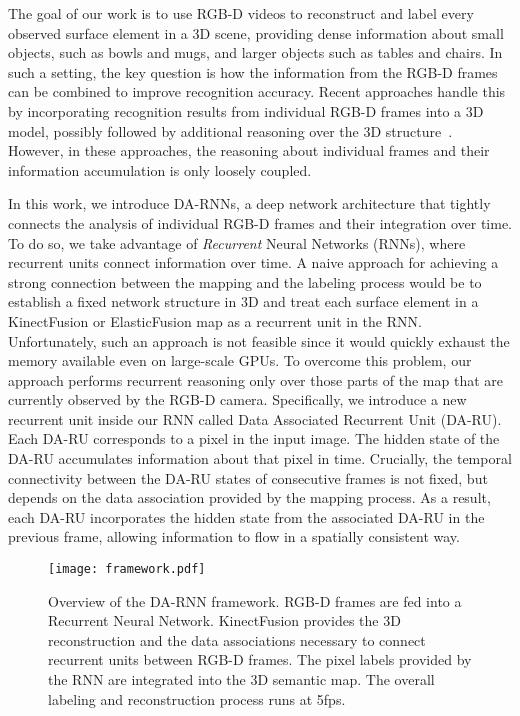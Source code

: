 \documentclass[conference]{IEEEtran}
\begin{document}
The goal of our work is to use RGB-D videos to reconstruct and label every observed surface element in a 3D scene, providing dense information about small objects, such as bowls and mugs, and larger objects such as tables and chairs. In such a setting, the key question is how the information from the RGB-D frames can be combined to improve recognition accuracy. Recent approaches handle this by incorporating recognition results from individual RGB-D frames into a 3D model, possibly followed by additional reasoning over the 3D structure~\cite{Lai13Obj,lai2014unsupervised,mccormac2016semanticfusion}. However, in these approaches, the reasoning about individual frames and their information accumulation is only loosely coupled.

In this work, we introduce DA-RNNs, a deep network architecture that tightly connects the analysis of individual RGB-D frames and their integration over time.  To do so, we take advantage of \emph{Recurrent} Neural Networks (RNNs), where recurrent units connect information over time.  A naive approach for achieving a strong connection between the mapping and the labeling process would be to establish a fixed network structure in 3D and treat each surface element in a KinectFusion or ElasticFusion map as a recurrent unit in the RNN. Unfortunately, such an approach is not feasible since it would quickly exhaust the memory available even on large-scale GPUs. To overcome this problem, our approach performs recurrent reasoning only over those parts of the map that are currently observed by the RGB-D camera.  Specifically, we introduce a new recurrent unit inside our RNN called Data Associated Recurrent Unit (DA-RU). Each DA-RU corresponds to a pixel in the input image. The hidden state of the DA-RU accumulates information about that pixel in time.  Crucially, the temporal connectivity between the DA-RU states of consecutive frames is not fixed, but depends on the data association provided by the mapping process.  As a result, each DA-RU incorporates the hidden state from the associated DA-RU in the previous frame, allowing information to flow in a spatially consistent way.


\begin{figure}
	\centering
	\texttt{[image: framework.pdf]}
	\caption{Overview of the DA-RNN framework.  RGB-D frames are fed into a Recurrent Neural Network.  KinectFusion provides the 3D reconstruction and  the data associations necessary to connect recurrent units between RGB-D frames.  The pixel labels provided by the RNN are integrated into the 3D semantic map. The overall labeling and reconstruction process runs at 5fps.}
	\label{fig:framework}
	\vspace{-4mm}
\end{figure}
\end{document}

